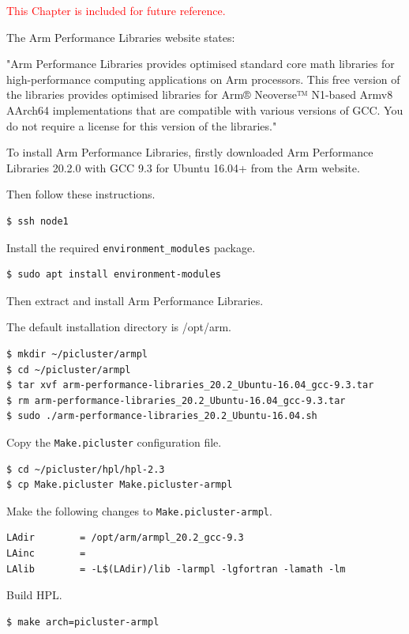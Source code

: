 \documentclass{report}
\begin{document}
\textcolor{red}{This Chapter is included for future reference.}

The Arm Performance Libraries website states:

"Arm Performance Libraries provides optimised standard core math libraries for high-performance computing applications on Arm processors. This free version of the libraries provides optimised libraries for Arm® Neoverse™ N1-based Armv8 AArch64 implementations that are compatible with various versions of GCC. You do not require a license for this version of the libraries."

To install Arm Performance Libraries, firstly downloaded Arm Performance Libraries 20.2.0 with GCC 9.3 for Ubuntu 16.04+ from the Arm website.

Then follow these instructions.

\lstset{style=type}
\begin{lstlisting}
$ ssh node1
\end{lstlisting}

Install the required \verb|environment_modules| package.

\lstset{style=type}
\begin{lstlisting}
$ sudo apt install environment-modules
\end{lstlisting}

Then extract and install Arm Performance Libraries.

The default installation directory is /opt/arm.

\lstset{style=type}
\begin{lstlisting}
$ mkdir ~/picluster/armpl
$ cd ~/picluster/armpl
$ tar xvf arm-performance-libraries_20.2_Ubuntu-16.04_gcc-9.3.tar
$ rm arm-performance-libraries_20.2_Ubuntu-16.04_gcc-9.3.tar
$ sudo ./arm-performance-libraries_20.2_Ubuntu-16.04.sh
\end{lstlisting}

Copy the \verb|Make.picluster| configuration file.

\lstset{style=type}
\begin{lstlisting}
$ cd ~/picluster/hpl/hpl-2.3
$ cp Make.picluster Make.picluster-armpl
\end{lstlisting}

Make the following changes to \verb|Make.picluster-armpl|.

\lstset{style=listingstyle}
\begin{lstlisting}[caption=Make.picluster-armpl, numbers=none]
LAdir        = /opt/arm/armpl_20.2_gcc-9.3
LAinc        =
LAlib        = -L$(LAdir)/lib -larmpl -lgfortran -lamath -lm
\end{lstlisting}

Build HPL.

\lstset{style=type}
\begin{lstlisting}
$ make arch=picluster-armpl
\end{lstlisting}


%
%
\end{document}
